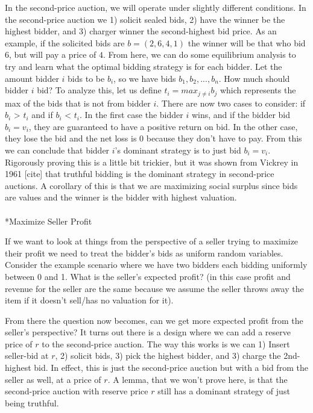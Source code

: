 \documentclass[
  letterpaper,
  DIV=11,
  numbers=noendperiod,
  oneside]{scrreprt}
\makeatletter
\let\oldparagraph\paragraph
\renewcommand{\paragraph}{
    \@ifstar
      \xxxParagraphStar
      \xxxParagraphNoStar
  }
\newcommand{\xxxParagraphStar}[1]{\oldparagraph*{#1}\mbox{}}
\newcommand{\xxxParagraphNoStar}[1]{\oldparagraph{#1}\mbox{}}
\theoremstyle{remark}
\makeatother
\begin{document}
In the second-price auction, we will operate under slightly different
conditions. In the second-price auction we 1) solicit sealed bids, 2)
have the winner be the highest bidder, and 3) charger winner the
second-highest bid price. As an example, if the solicited bids are
\(b = (2, 6, 4, 1)\) the winner will be that who bid \(6\), but will pay
a price of \(4\). From here, we can do some equilibrium analysis to try
and learn what the optimal bidding strategy is for each bidder. Let the
amount bidder \(i\) bids to be \(b_i\), so we have bids
\(b_1, b_2, ..., b_n\). How much should bidder \(i\) bid? To analyze
this, let us define \(t_i = max_{j \neq i} b_j\) which represents the
max of the bids that is not from bidder \(i\). There are now two cases
to consider: if \(b_i\) \textgreater{} \(t_i\) and if \(b_i\)
\textless{} \(t_i\). In the first case the bidder \(i\) wins, and if the
bidder bid \(b_i = v_i\), they are guaranteed to have a positive return
on bid. In the other case, they lose the bid and the net loss is 0
because they don't have to pay. From this we can conclude that bidder
\(i\)'s dominant strategy is to just bid \(b_i = v_i\). Rigorously
proving this is a little bit trickier, but it was shown from Vickrey in
1961 {[}cite{]} that truthful bidding is the dominant strategy in
second-price auctions. A corollary of this is that we are maximizing
social surplus since bids are values and the winner is the bidder with
highest valuation.

\paragraph*{Maximize Seller Profit}\label{maximize-seller-profit}

If we want to look at things from the perspective of a seller trying to
maximize their profit we need to treat the bidder's bids as uniform
random variables. Consider the example scenario where we have two
bidders each bidding uniformly between 0 and 1. What is the seller's
expected profit? (in this case profit and revenue for the seller are the
same because we assume the seller throws away the item if it doesn't
sell/has no valuation for it).

From there the question now becomes, can we get more expected profit
from the seller's perspective? It turns out there is a design where we
can add a reserve price of \(r\) to the second-price auction. The way
this works is we can 1) Insert seller-bid at \(r\), 2) solicit bids, 3)
pick the highest bidder, and 3) charge the 2nd-highest bid. In effect,
this is just the second-price auction but with a bid from the seller as
well, at a price of \(r\). A lemma, that we won't prove here, is that
the second-price auction with reserve price \(r\) still has a dominant
strategy of just being truthful.
\end{document}

